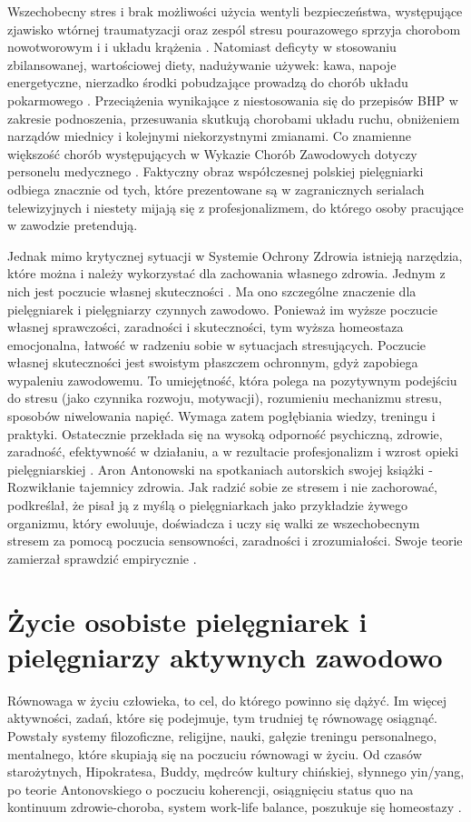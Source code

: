 \documentclass[a4paper,12pt,twoside,openright]{mwrep}
\begin{document}
Wszechobecny stres i brak możliwości użycia wentyli bezpieczeństwa, występujące zjawisko wtórnej traumatyzacji oraz zespól stresu pourazowego sprzyja chorobom nowotworowym i i układu krążenia \cite{skutki}. Natomiast deficyty w stosowaniu zbilansowanej, wartościowej diety, nadużywanie używek: kawa, napoje energetyczne, nierzadko środki pobudzające prowadzą do chorób układu pokarmowego \cite{p.p}. Przeciążenia wynikające z niestosowania się do przepisów BHP w zakresie podnoszenia, przesuwania skutkują chorobami układu ruchu, obniżeniem narządów miednicy i kolejnymi niekorzystnymi zmianami. Co znamienne większość chorób występujących w Wykazie Chorób Zawodowych dotyczy personelu medycznego \cite{wykaz}. Faktyczny obraz współczesnej polskiej pielęgniarki odbiega znacznie od tych, które prezentowane są w zagranicznych serialach telewizyjnych i niestety mijają się z profesjonalizmem, do którego osoby pracujące w zawodzie pretendują.

Jednak mimo krytycznej sytuacji w Systemie Ochrony Zdrowia istnieją narzędzia, które można i należy wykorzystać dla zachowania własnego zdrowia. Jednym z nich jest poczucie własnej skuteczności \cite{skutecznosc}. Ma ono szczególne znaczenie dla pielęgniarek i pielęgniarzy czynnych zawodowo. Ponieważ im wyższe poczucie własnej sprawczości, zaradności i skuteczności, tym wyższa homeostaza emocjonalna, łatwość w radzeniu sobie w sytuacjach stresujących. Poczucie własnej skuteczności jest swoistym płaszczem ochronnym, gdyż zapobiega wypaleniu zawodowemu. To umiejętność, która polega na pozytywnym podejściu do stresu (jako czynnika rozwoju, motywacji), rozumieniu mechanizmu stresu, sposobów niwelowania napięć. Wymaga zatem pogłębiania wiedzy, treningu i praktyki. Ostatecznie przekłada się na wysoką odporność psychiczną, zdrowie, zaradność, efektywność w działaniu, a w rezultacie profesjonalizm i wzrost opieki pielęgniarskiej \cite{stres}. Aron Antonowski  na spotkaniach autorskich  swojej książki -  Rozwikłanie tajemnicy zdrowia. Jak radzić sobie ze stresem i nie zachorować, podkreślał, że pisał ją z myślą o pielęgniarkach jako przykładzie żywego organizmu, który ewoluuje, doświadcza i uczy się walki ze wszechobecnym stresem za pomocą poczucia sensowności, zaradności i zrozumiałości. Swoje teorie zamierzał sprawdzić empirycznie \cite{aron}.

\section{Życie osobiste pielęgniarek i pielęgniarzy \newline aktywnych zawodowo}
\label{sectionZycieOsobiste}
Równowaga w życiu człowieka, to cel, do którego powinno się dążyć. Im więcej aktywności, zadań, które się podejmuje, tym trudniej tę równowagę osiągnąć. Powstały systemy filozoficzne, religijne, nauki, gałęzie treningu personalnego, mentalnego, które skupiają się na poczuciu równowagi w życiu. Od czasów starożytnych, Hipokratesa, Buddy, mędrców kultury chińskiej, słynnego yin/yang, po teorie Antonovskiego o poczuciu koherencji, osiągnięciu status quo na kontinuum zdrowie-choroba, system work-life balance, poszukuje się homeostazy \cite{salutogeneza}.
\end{document}
